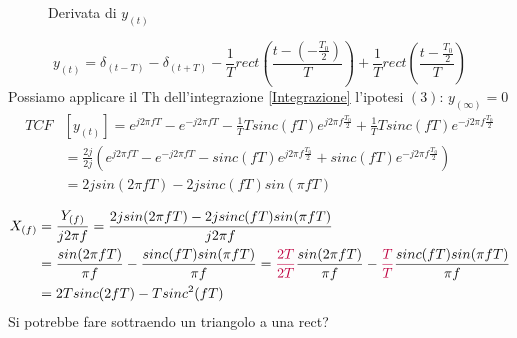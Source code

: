{\begin{figure}[H]
                            \caption{Derivata di $y_{(t)}$}
                            \label{fig:derivata rect meno triangolo}
                        \end{figure}
                        \[
                            y_{(t)} =\delta_{(t-T)}-\delta_{(t+T)}-\frac{1}{T}rect\left(\frac{t-\left(-\frac{T_0}{2}\right)}{T}\right)+\frac{1}{T}rect\left(\frac{t-\frac{T_0}{2}}{T}\right)   
                        \]
                        Possiamo applicare il Th dell'integrazione \ref{Integrazione} l'ipotesi $(3)$: $y_{(\infty)}=0$
                        \begin{align}
                            TCF&[y_{(t)}] = e^{j2\pi fT}-e^{-j2\pi fT}-\frac{1}{T}Tsinc(fT)e^{j2\pi f\frac{T_0}{2}}+\frac{1}{T}Tsinc(fT)e^{-j2\pi f\frac{T_0}{2}}  \nonumber \\
                               &= \frac{2j}{2j}\left(e^{j2\pi fT}-e^{-j2\pi fT}-sinc(fT)e^{j2\pi f\frac{T_0}{2}}+sinc(fT)e^{-j2\pi f\frac{T_0}{2}}\right) \nonumber \\
                               &= 2jsin(2\pi fT)-2jsinc(fT)sin(\pi fT) \nonumber
                        \end{align}
                        
                        \begin{align}
                            X_{(f)} &= \frac{Y_{(f)}}{j2\pi f} = \frac{2jsin(2\pi fT)-2jsinc(fT)sin(\pi fT)}{j2\pi f} \nonumber \\
                                    &= \frac{sin(2\pi fT)}{\pi f} - \frac{sinc(fT)sin(\pi fT)}{\pi f} ={\color{purple}\frac{2T}{2T}} \frac{sin(2\pi fT)}{\pi f} - {\color{purple}\frac{T}{T}}\frac{sinc(fT)sin(\pi fT)}{\pi f} \nonumber \\
                                    &= 2Tsinc(2fT)-Tsinc^2(fT)\nonumber 
                        \end{align}
                        Si potrebbe fare sottraendo un triangolo a una rect?
                    }
